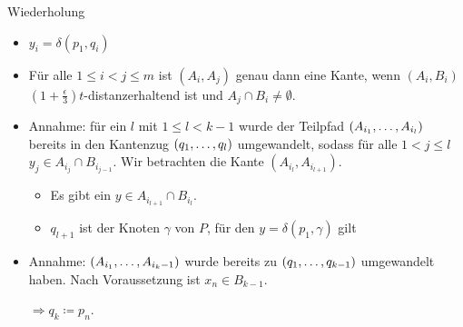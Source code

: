 \documentclass{beamer}
\begin{document}
	\begin{frame}[t]
		\begin{block}{Wiederholung}
			\begin{itemize}
				\item $y_i = \delta(p_1, q_i)$
				\item Für alle $1\leq i < j \leq m$ ist $(A_i, A_j)$ genau dann eine Kante, wenn $(A_i, B_i)$ $(1 + \frac{\epsilon}{3})t$-distanzerhaltend ist und $A_j \cap B_i \neq \emptyset$.
			\end{itemize}
		\end{block}
		
		
		\vspace{10px}
		\begin{itemize}
			\item<2-> Annahme: für ein $l$ mit $1 \leq l < k-1$ wurde der Teilpfad $(A_{i_1}, \mathellipsis, A_{i_l})$ bereits in den Kantenzug $(q_1, \mathellipsis, q_l)$ umgewandelt, sodass für alle $1 < j \leq l$ $y_j \in A_{i_j} \cap B_{i_{j-1}}$.  
			Wir betrachten die Kante $(A_{i_l}, A_{i_{l+1}})$.
			\begin{itemize}
				\item Es gibt ein $y \in A_{i_{l+1}} \cap B_{i_l}$.
				\item $q_{l+1}$ ist der Knoten $\gamma$ von $P$, für den $y = \delta(p_1, \gamma)$ gilt 
			\end{itemize}
			\item<3-> Annahme: $(A_{i_1}, \mathellipsis, A_{i_k-1})$ wurde bereits zu $(q_1, \mathellipsis, q_{k-1})$ umgewandelt haben. 
			Nach Voraussetzung ist $x_n \in B_{k-1}$. 
			
			$\Rightarrow q_k \coloneqq p_n$. 
		\end{itemize}
	\end{frame}
	
\end{document}
